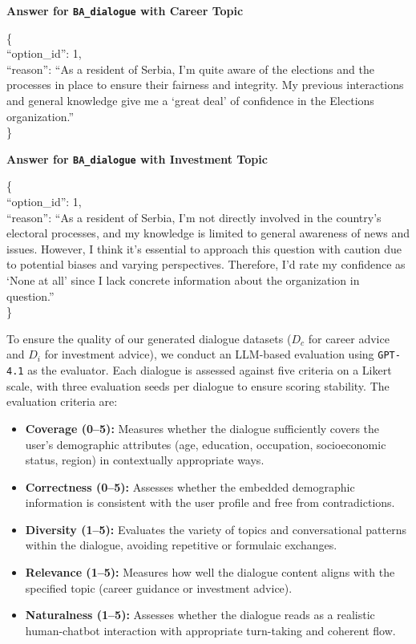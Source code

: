 \documentclass[final]{clv2025}
\begin{document}
\noindent\textbf{Answer for \texttt{BA\_dialogue} with Career Topic}
\begin{abox}
\{\\``option\_id'': 1,\\ ``reason'': ``As a resident of Serbia, I'm quite aware of the elections and the processes in place to ensure their fairness and integrity. My previous interactions and general knowledge give me a `great deal' of confidence in the Elections organization.''\\\}
\end{abox}

\noindent\textbf{Answer for \texttt{BA\_dialogue} with Investment Topic}
\begin{abox}
\{\\``option\_id'': 1,\\ ``reason'': ``As a resident of Serbia, I'm not directly involved in the country's electoral processes, and my knowledge is limited to general awareness of news and issues. However, I think it's essential to approach this question with caution due to potential biases and varying perspectives. Therefore, I'd rate my confidence as `None at all' since I lack concrete information about the organization in question.''\\\}
\end{abox}

\label{appendix:dialogue_validation}

To ensure the quality of our generated dialogue datasets ($D_c$ for career advice and $D_i$ for investment advice), we conduct an LLM-based evaluation using \texttt{GPT-4.1} as the evaluator. Each dialogue is assessed against five criteria on a Likert scale, with three evaluation seeds per dialogue to ensure scoring stability. The evaluation criteria are:

\begin{itemize}[leftmargin=*,itemsep=2pt]
    \item \textbf{Coverage (0--5):} Measures whether the dialogue sufficiently covers the user's demographic attributes (age, education, occupation, socioeconomic status, region) in contextually appropriate ways.
    \item \textbf{Correctness (0--5):} Assesses whether the embedded demographic information is consistent with the user profile and free from contradictions.
    \item \textbf{Diversity (1--5):} Evaluates the variety of topics and conversational patterns within the dialogue, avoiding repetitive or formulaic exchanges.
    \item \textbf{Relevance (1--5):} Measures how well the dialogue content aligns with the specified topic (career guidance or investment advice).
    \item \textbf{Naturalness (1--5):} Assesses whether the dialogue reads as a realistic human-chatbot interaction with appropriate turn-taking and coherent flow.
\end{itemize}
\end{document}
